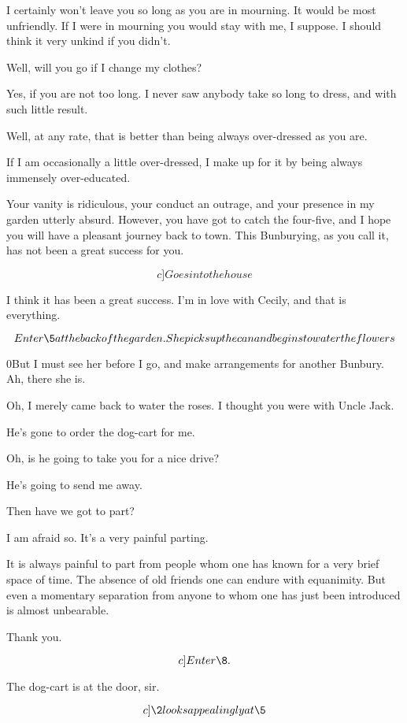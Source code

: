 \documentclass{book}
\begin{document}
\2  I certainly won't leave you so long as you are in
mourning.  It would be most unfriendly.  If I were in mourning you
would stay with me, I suppose.  I should think it very unkind if
you didn't.

\1  Well, will you go if I change my clothes?

\2  Yes, if you are not too long.  I never saw anybody take
so long to dress, and with such little result.

\1  Well, at any rate, that is better than being always over-dressed
as you are.

\2  If I am occasionally a little over-dressed, I make up
for it by being always immensely over-educated.

\1  Your vanity is ridiculous, your conduct an outrage, and your
presence in my garden utterly absurd.  However, you have got to
catch the four-five, and I hope you will have a pleasant journey
back to town.  This Bunburying, as you call it, has not been a
great success for you.

\[c]Goes into the house\]

\2  I think it has been a great success.  I'm in love with
Cecily, and that is everything.

\[Enter \5 at the back of the garden.  She picks up the can and
begins to water the flowers\]

\00But I must see her before I go, and
make arrangements for another Bunbury.  Ah, there she is.

\5  Oh, I merely came back to water the roses.  I thought you
were with Uncle Jack.

\2  He's gone to order the dog-cart for me.

\5  Oh, is he going to take you for a nice drive?

\2  He's going to send me away.

\5  Then have we got to part?

\2  I am afraid so.  It's a very painful parting.

\5  It is always painful to part from people whom one has
known for a very brief space of time.  The absence of old friends
one can endure with equanimity.  But even a momentary separation
from anyone to whom one has just been introduced is almost
unbearable.

\2  Thank you.

\[c]Enter \8.\]

\8  The dog-cart is at the door, sir.

\[c]\2 looks appealingly at \5\]
\end{document}

